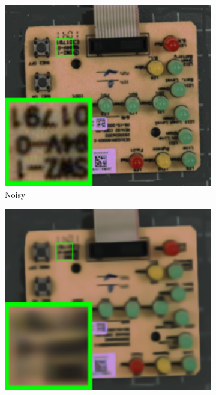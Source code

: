 \begin{figure}
    \centering
    \begin{subfigure}[t]{0.19\textwidth}
        \centering
        \includegraphics[width=1\textwidth]{images/guided/nc/resize_br_Noisy_circuit.png}
		\caption{Noisy}
    \end{subfigure}
    \hfill
    \begin{subfigure}[t]{0.19\textwidth}
        \centering
        \includegraphics[width=1\textwidth]{images/guided/nc/resize_br_BM3DPoisson_circuit.png}

\end{subfigure}
\end{figure}
